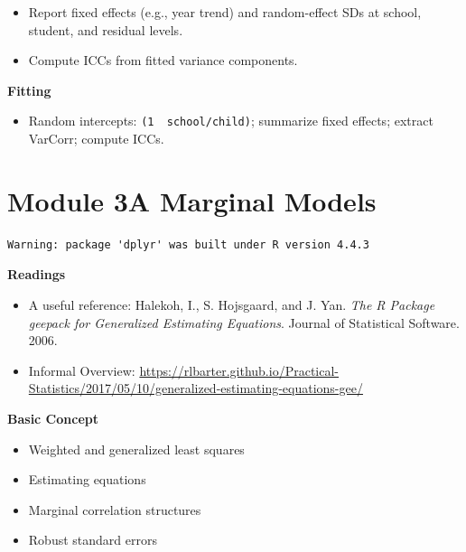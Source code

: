 \documentclass[
  letterpaper,
  DIV=11,
  numbers=noendperiod]{scrreprt}
\providecommand{\tightlist}{%
  \setlength{\itemsep}{0pt}\setlength{\parskip}{0pt}}\usepackage{longtable,booktabs,array}
\begin{document}
\begin{itemize}
\tightlist
\item
  Report fixed effects (e.g., year trend) and random-effect SDs at
  school, student, and residual levels.
\item
  Compute ICCs from fitted variance components.
\end{itemize}

\textbf{Fitting}

\begin{itemize}
\tightlist
\item
  Random intercepts: \texttt{(1\ \textbar{}\ school/child)}; summarize
  fixed effects; extract VarCorr; compute ICCs.
\end{itemize}


\hypertarget{module-3a-marginal-models}{%
\chapter*{Module 3A Marginal Models}\label{module-3a-marginal-models}}


\begin{verbatim}
Warning: package 'dplyr' was built under R version 4.4.3
\end{verbatim}

\textbf{Readings}

\begin{itemize}
\item
  A useful reference: Halekoh, I., S. Hojsgaard, and J. Yan. \emph{The R
  Package geepack for Generalized Estimating Equations}. Journal of
  Statistical Software. 2006.
\item
  Informal Overview:
  \url{https://rlbarter.github.io/Practical-Statistics/2017/05/10/generalized-estimating-equations-gee/}
\end{itemize}

\textbf{Basic Concept}

\begin{itemize}
\item
  Weighted and generalized least squares
\item
  Estimating equations
\item
  Marginal correlation structures
\item
  Robust standard errors
\end{itemize}
\end{document}
